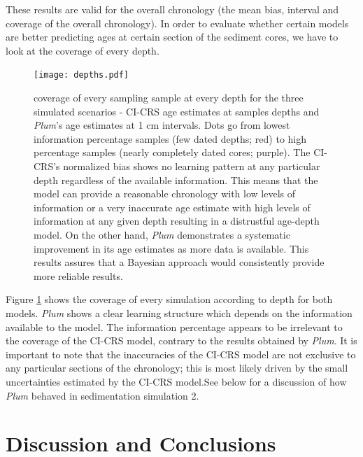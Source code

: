 \documentclass [10pt] {article}
\begin{document}
These results are valid for the overall chronology (the mean bias, interval and coverage of the overall chronology). 
In order to evaluate whether certain models are better predicting ages at certain section of the sediment cores, we have to look at the coverage of every depth. 


\begin{figure}[!]
	\begin{centering}
		\texttt{[image: depths.pdf]}
		\caption{coverage of every sampling sample at every depth for the three simulated scenarios - CI-CRS age estimates at samples depths and \textit{Plum}'s age estimates at 1 cm intervals. Dots go from lowest information percentage samples (few dated depths; red) to high percentage samples (nearly completely dated cores; purple). The CI-CRS's normalized bias shows no learning pattern at any particular depth regardless of the available information. This means that the model can provide a reasonable chronology with low levels of information or a very inaccurate age estimate with high levels of information at any given depth resulting in a distrustful age-depth model. On the other hand, \textit{Plum} demonstrates a systematic improvement in its age estimates as more data is available. This results assures that a Bayesian approach would consistently provide more reliable results.     }
		\label{fig:depths}
	\end{centering}
\end{figure}

Figure \ref{fig:depths} shows the coverage of every simulation according to depth for both models.
\textit{Plum} shows a clear learning structure which depends on the information available to the model.
The information percentage appears to be irrelevant to the coverage of the CI-CRS model, contrary to the results obtained by \textit{Plum}.
It is important to note that the inaccuracies of the CI-CRS model are not exclusive to any particular sections of the chronology; this is most likely driven by the small uncertainties estimated by the CI-CRS model.See below for a discussion of how \textit{Plum} behaved in sedimentation simulation 2.   






\section{Discussion and Conclusions}
\end{document}
